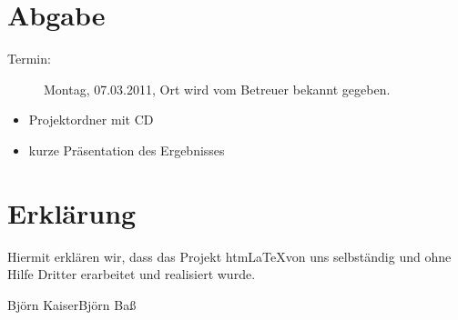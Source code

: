 \documentclass[	a4paper,		%
		titlepage, 		%
		fontsize=12pt		%
		]{scrartcl} 		%
\begin{document}
\section{Abgabe}
\begin{description}
 \item[Termin:] Montag, 07.03.2011, Ort wird vom Betreuer bekannt gegeben.
 \end{description}
\begin{itemize}
 \item Projektordner mit CD
 \item kurze Präsentation des Ergebnisses
\end{itemize}

\newpage
\nocite{Algorithmen_in_C++}
\nocite{Algorithmen_in_Java}


\newpage
\section{Erklärung}
Hiermit erklären wir, dass das Projekt htm\LaTeX von uns selbständig und ohne Hilfe Dritter erarbeitet und realisiert wurde.

\vspace{3cm}
\noindent
\hrulefill \hfill \hrulefill \newline
Björn Kaiser\hfill Björn Baß
\newpage
\newpage	%
\end{document}
